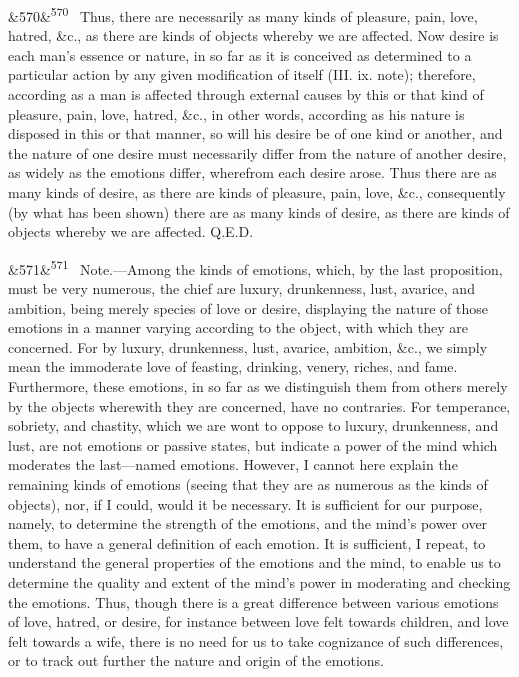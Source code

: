 \documentclass[12pt]{article}
\newcommand{\para}[1][]{\par\noindent\ifx&#1&\else\textsuperscript{\footnotesize #1}~\fi}
\begin{document}
\para[570] Thus, there are necessarily as many kinds of pleasure, pain, love, hatred, \&c., as there are kinds of objects whereby we are affected. Now desire is each man's essence or nature, in so far as it is conceived as determined to a particular action by any given modification of itself (III. ix. note); therefore, according as a man is affected through external causes by this or that kind of pleasure, pain, love, hatred, \&c., in other words, according as his nature is disposed in this or that manner, so will his desire be of one kind or another, and the nature of one desire must necessarily differ from the nature of another desire, as widely as the emotions differ, wherefrom each desire arose. Thus there are as many kinds of desire, as there are kinds of pleasure, pain, love, \&c., consequently (by what has been shown) there are as many kinds of desire, as there are kinds of objects whereby we are affected. Q.E.D.

\para[571] Note.---Among the kinds of emotions, which, by the last proposition, must be very numerous, the chief are luxury, drunkenness, lust, avarice, and ambition, being merely species of love or desire, displaying the nature of those emotions in a manner varying according to the object, with which they are concerned. For by luxury, drunkenness, lust, avarice, ambition, \&c., we simply mean the immoderate love of feasting, drinking, venery, riches, and fame. Furthermore, these emotions, in so far as we distinguish them from others merely by the objects wherewith they are concerned, have no contraries. For temperance, sobriety, and chastity, which we are wont to oppose to luxury, drunkenness, and lust, are not emotions or passive states, but indicate a power of the mind which moderates the last---named emotions. However, I cannot here explain the remaining kinds of emotions (seeing that they are as numerous as the kinds of objects), nor, if I could, would it be necessary. It is sufficient for our purpose, namely, to determine the strength of the emotions, and the mind's power over them, to have a general definition of each emotion. It is sufficient, I repeat, to understand the general properties of the emotions and the mind, to enable us to determine the quality and extent of the mind's power in moderating and checking the emotions. Thus, though there is a great difference between various emotions of love, hatred, or desire, for instance between love felt towards children, and love felt towards a wife, there is no need for us to take cognizance of such differences, or to track out further the nature and origin of the emotions.
\end{document}
